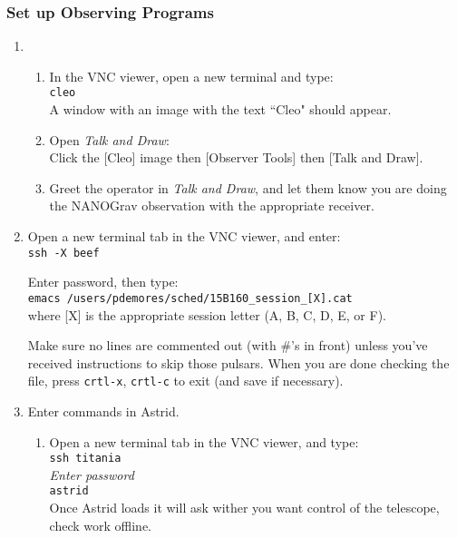\documentclass[11pt, reqno, tbtags]{article}
\begin{document}
\subsubsection{Set up Observing Programs}\label{VNC:stuff} %
\begin{enumerate}
 \item \begin{enumerate} %
  \item\label{cleo:stuff} In the VNC viewer, open a new terminal and type: \\ %
  \texttt{cleo} \\
  A window with an image with the text ``Cleo" should appear. 
  \item Open \textit{Talk and Draw}: \\
  Click the [Cleo] image then [Observer Tools] then [Talk and Draw]. %
  \item Greet the operator in \textit{Talk and Draw}, and let them know you are doing the NANOGrav observation with the appropriate receiver.  %
 \end{enumerate}
 \item Open a new terminal tab in the VNC viewer, and enter: \\  %
 \texttt{ssh -X beef} 
 
 Enter password, then type: \\
 \texttt{emacs /users/pdemores/sched/15B160\_session\_[X].cat} \\                         
 where [X] is the appropriate session letter (A, B, C, D, E, or F).                                

 Make sure no lines are commented out (with \#'s in front) unless you've received instructions to skip those pulsars. When you are done checking the file, press \texttt{crtl-x}, \texttt{crtl-c} to exit (and save if necessary).  

 \item Enter commands in Astrid. \begin{enumerate}  %
  \item Open a new terminal tab in the VNC viewer, and type: \\  %
  \texttt{ssh titania} \\                                                                                  
  \emph{Enter password} \\
  \texttt{astrid} \\
  Once Astrid loads it will ask wither you want control of the telescope, check work offline.


\end{enumerate}
\end{enumerate}
\end{document}
